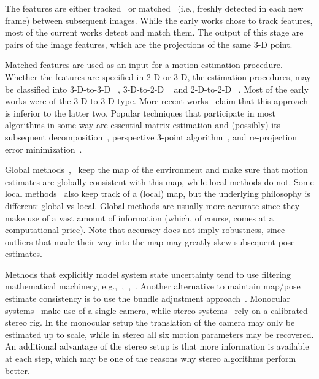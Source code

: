 The features are either tracked~\cite{Hedborg2009} or
matched~\cite{Geiger2011} (i.e., freshly detected in each new frame)
between subsequent images. While the early works chose to track
features, most of the current works detect and match them. The output
of this stage are pairs of the image features, which are the
projections of the same 3-D point.

Matched features are used as an input for a motion estimation
procedure.  Whether the features are specified in 2-D or 3-D, the
estimation procedures, may be classified into 3-D-to-3-D
~\cite{Milella2006}, 3-D-to-2-D ~\cite{Geiger2011} and 2-D-to-2-D
~\cite{Nister2004}. Most of the early works were of the 3-D-to-3-D
type.  More recent works~\cite{Nister2004} claim that this approach is
inferior to the latter two. Popular techniques that participate in
most algorithms in some way are essential matrix estimation and
(possibly) its subsequent decomposition~\cite{Nister2004}, perspective
3-point algorithm~\cite{Kneip1991}, and re-projection error
minimization~\cite{Geiger2011}.

Global methods~\cite{Klein2007},~\cite{Newcombe2011} keep the map of
the environment and make sure that motion estimates are globally
consistent with this map, while local methods do not.  Some local
methods~\cite{Badino2013} also keep track of a (local) map, but the
underlying philosophy is different: global vs local.  Global methods
are usually more accurate since they make use of a vast amount of
information (which, of course, comes at a computational price).  Note
that accuracy does not imply robustness, since outliers that made
their way into the map may greatly skew subsequent pose estimates.

Methods that explicitly model system state uncertainty tend to use
filtering mathematical machinery,
e.g.,~\cite{Konolige2010},~\cite{Olson2003},~\cite{Kaess2008}.
Another alternative to maintain map/pose estimate consistency is to
use the bundle adjustment approach~\cite{Triggs2000}. Monocular
systems~\cite{Song} make use of a single camera, while stereo
systems~\cite{Geiger2011} rely on a calibrated stereo rig. In the
monocular setup the translation of the camera may only be estimated up
to scale, while in stereo all six motion parameters may be
recovered. An additional advantage of the stereo setup is that more
information is available at each step, which may be one of the reasons
why stereo algorithms perform better.

